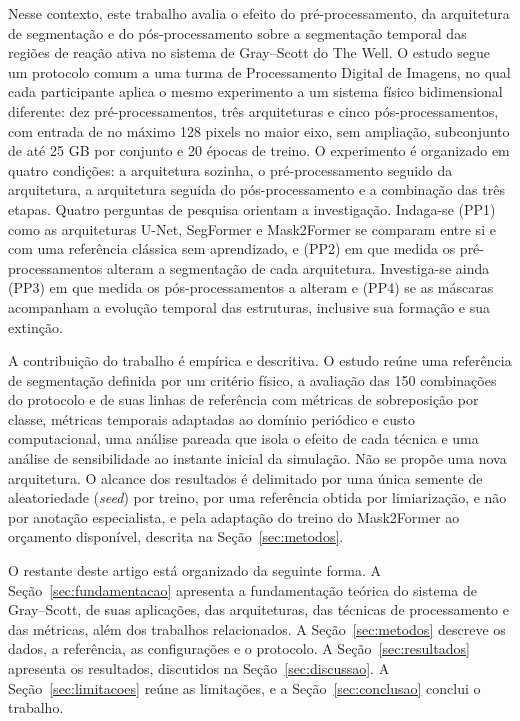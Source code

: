 \documentclass[12pt]{article}
\begin{document}
Nesse contexto, este trabalho avalia o efeito do pré-processamento, da arquitetura de segmentação e do pós-processamento sobre a segmentação temporal das regiões de reação ativa no sistema de Gray--Scott do The Well. O estudo segue um protocolo comum a uma turma de Processamento Digital de Imagens, no qual cada participante aplica o mesmo experimento a um sistema físico bidimensional diferente: dez pré-processamentos, três arquiteturas e cinco pós-processamentos, com entrada de no máximo 128 pixels no maior eixo, sem ampliação, subconjunto de até 25 GB por conjunto e 20 épocas de treino. O experimento é organizado em quatro condições: a arquitetura sozinha, o pré-processamento seguido da arquitetura, a arquitetura seguida do pós-processamento e a combinação das três etapas. Quatro perguntas de pesquisa orientam a investigação. Indaga-se (PP1) como as arquiteturas U-Net, SegFormer e Mask2Former se comparam entre si e com uma referência clássica sem aprendizado, e (PP2) em que medida os pré-processamentos alteram a segmentação de cada arquitetura. Investiga-se ainda (PP3) em que medida os pós-processamentos a alteram e (PP4) se as máscaras acompanham a evolução temporal das estruturas, inclusive sua formação e sua extinção.

A contribuição do trabalho é empírica e descritiva. O estudo reúne uma referência de segmentação definida por um critério físico, a avaliação das 150 combinações do protocolo e de suas linhas de referência com métricas de sobreposição por classe, métricas temporais adaptadas ao domínio periódico e custo computacional, uma análise pareada que isola o efeito de cada técnica e uma análise de sensibilidade ao instante inicial da simulação. Não se propõe uma nova arquitetura. O alcance dos resultados é delimitado por uma única semente de aleatoriedade (\textit{seed}) por treino, por uma referência obtida por limiarização, e não por anotação especialista, e pela adaptação do treino do Mask2Former ao orçamento disponível, descrita na Seção~\ref{sec:metodos}.

O restante deste artigo está organizado da seguinte forma. A Seção~\ref{sec:fundamentacao} apresenta a fundamentação teórica do sistema de Gray--Scott, de suas aplicações, das arquiteturas, das técnicas de processamento e das métricas, além dos trabalhos relacionados. A Seção~\ref{sec:metodos} descreve os dados, a referência, as configurações e o protocolo. A Seção~\ref{sec:resultados} apresenta os resultados, discutidos na Seção~\ref{sec:discussao}. A Seção~\ref{sec:limitacoes} reúne as limitações, e a Seção~\ref{sec:conclusao} conclui o trabalho.
\end{document}
